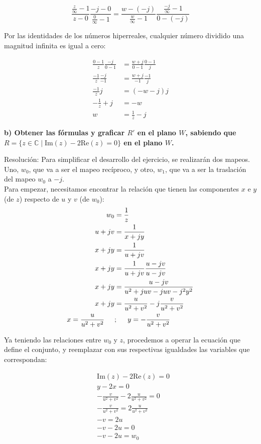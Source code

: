 \documentclass[12pt,a4paper]{report}
\begin{document}
$$\frac{\frac{z}{\infty}-1}{z-0} \frac{-j-0}{\frac{0}{\infty}-1} = \frac{w-(-j)}{\frac{w}{\infty}-1} \frac{\frac{-j}{\infty}-1}{0-(-j)}$$

Por las identidades de los números hiperreales, cualquier número dividido una magnitud infinita es igual a cero:

\begin{align*}
    \frac{0-1}{z} \frac{-j}{0-1} &= \frac{w+j}{0-1} \frac{0-1}{j}\\
    \frac{-1}{z} \frac{-j}{-1} &= \frac{w+j}{-1} \frac{-1}{j}\\
    \frac{-1}{z}j &= (-w-j)j\\
    -\frac{1}{z}+j &= -w\\
    w &= \frac{1}{z}-j
\end{align*}

\textbf{b) Obtener las fórmulas y graficar \( R' \) en el plano \( W \), sabiendo que \( R = \{z \in \mathbb{C} \mid \text{Im}(z) - 2\text{Re}(z) = 0\} \) en el plano \( W \).}

Resolución: Para simplificar el desarrollo del ejercicio, se realizarán dos mapeos. Uno, \( w_0 \), que va a ser el mapeo recíproco, y otro, \( w_1 \), que va a ser la traslación del mapeo \( w_0 \) a \( -j \).\\

Para empezar, necesitamos encontrar la relación que tienen las componentes $x$ e $y$ (de $z$) respecto de $u$ y $v$ (de $w_0$):
\begin{align*}
    w_0 &=\frac{1}{z}\\
    u+jv &=\frac{1}{x+jy}\\
    x+jy &= \frac{1}{u+jv}\\
    x+jy &= \frac{1}{u+jv} \frac{u-jv}{u-jv}\\
    x+jy &= \frac{u-jv}{u^2+juv-juv-j^2y^2}\\
    x+jy &= \frac{u}{u^2+v^2}-j\frac{v}{u^2+v^2}\\
    x=\frac{u}{u^2+v^2} \hspace{0.5cm} &;\hspace{0.5cm} y=-\frac{v}{u^2+v^2}\\
\end{align*}


Ya teniendo las relaciones entre \( w_0 \) y \( z \), procedemos a operar la ecuación que define el conjunto, y reemplazar con sus respectivas igualdades las variables que correspondan:

\begin{align*}
&\text{Im}(z) - 2\text{Re}(z) = 0\\ 
&y - 2x = 0\\ 
&-\frac{v}{u^2 + v^2} - 2\frac{u}{u^2 + v^2} = 0\\ 
&-\frac{v}{u^2 + v^2} = 2\frac{u}{u^2 + v^2}\\ 
&-v=2u\\
&-v - 2u = 0\\ 
&-v - 2u = w_0\\ 
\end{align*}
\end{document}
